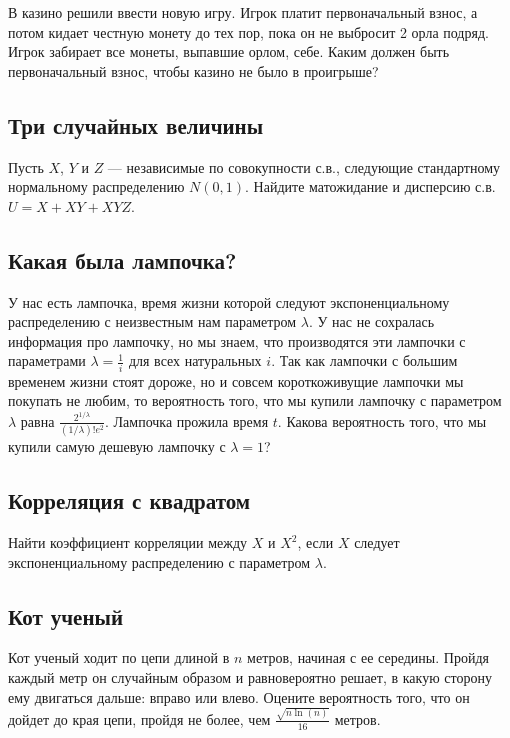 \documentclass[12pt]{article}
\begin{document}
В казино решили ввести новую игру. Игрок платит первоначальный взнос, а потом кидает честную монету до тех пор, пока он не выбросит 2 орла подряд. Игрок забирает все монеты, выпавшие орлом, себе. Каким должен быть первоначальный взнос, чтобы казино не было в проигрыше?



\subsection{Три случайных величины}

Пусть $X$, $Y$ и $Z$ --- независимые по совокупности с.в., следующие стандартному нормальному распределению $N(0, 1)$. Найдите матожидание и дисперсию с.в. $U = X + XY + XYZ$. 



\subsection{Какая была лампочка?}

У нас есть лампочка, время жизни которой следуют экспоненциальному распределению с неизвестным нам параметром $\lambda$. У нас не сохралась информация про лампочку, но мы знаем, что производятся эти лампочки с параметрами $\lambda = \frac{1}{i}$ для всех натуральных $i$. Так как лампочки с большим временем жизни стоят дороже, но и совсем короткоживущие лампочки мы покупать не любим, то вероятность того, что мы купили лампочку с параметром $\lambda$ равна $\frac{2^{1/\lambda}}{(1/\lambda)!e^2}$. Лампочка прожила время $t$. Какова вероятность того, что мы купили самую дешевую лампочку с $\lambda = 1$?




\subsection{Корреляция с квадратом}

Найти коэффициент корреляции между $X$ и $X^2$, если $X$ следует экспоненциальному распределению с параметром $\lambda$.



\subsection{Кот ученый}

Кот ученый ходит по цепи длиной в $n$ метров, начиная с ее середины. Пройдя каждый метр он случайным образом и равновероятно решает, в какую сторону ему двигаться дальше: вправо или влево. Оцените вероятность того, что он дойдет до края цепи, пройдя не более, чем $\frac{\sqrt{n \ln(n)}}{16}$ метров.
\end{document}
